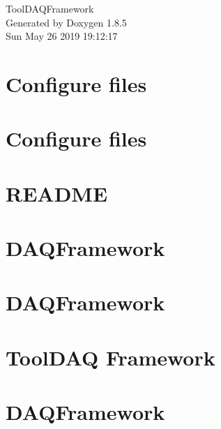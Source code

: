 \documentclass[twoside]{book}
\newcommand{\clearemptydoublepage}{%
  \newpage{\pagestyle{empty}\cleardoublepage}%
}
\begin{document}
\hypersetup{pageanchor=false}
\begin{titlepage}
\vspace*{7cm}
\begin{center}%
{\Large Tool\-D\-A\-Q\-Framework }\\
\vspace*{1cm}
{\large Generated by Doxygen 1.8.5}\\
\vspace*{0.5cm}
{\small Sun May 26 2019 19:12:17}\\
\end{center}
\end{titlepage}
\clearemptydoublepage
\tableofcontents
\clearemptydoublepage
{}
\hypersetup{pageanchor=true}

\chapter{Configure files}
\label{md_configfiles_README}
\hypertarget{md_configfiles_README}{}

\chapter{Configure files}
\label{md_configfiles_template_README}
\hypertarget{md_configfiles_template_README}{}

\chapter{R\-E\-A\-D\-M\-E}
\label{md_DataModel_README}
\hypertarget{md_DataModel_README}{}

\chapter{D\-A\-Q\-Framework}
\label{md_include_README}
\hypertarget{md_include_README}{}

\chapter{D\-A\-Q\-Framework}
\label{md_lib_README}
\hypertarget{md_lib_README}{}

\chapter{Tool\-D\-A\-Q Framework}
\label{md_README}
\hypertarget{md_README}{}

\chapter{D\-A\-Q\-Framework}
\label{md_src_Store_README}
\hypertarget{md_src_Store_README}{}

\end{document}
